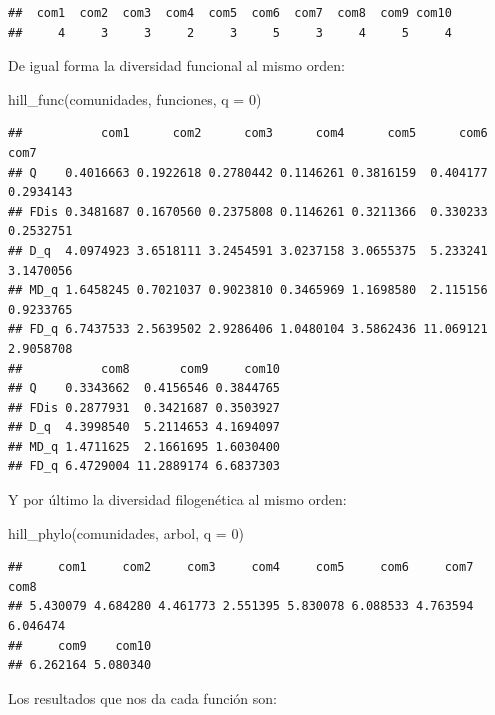 \documentclass[
]{article}
\newenvironment{Shaded}{\begin{snugshade}}{\end{snugshade}}
\newcommand{\AttributeTok}[1]{\textcolor[rgb]{0.77,0.63,0.00}{#1}}
\newcommand{\DecValTok}[1]{\textcolor[rgb]{0.00,0.00,0.81}{#1}}
\newcommand{\FunctionTok}[1]{\textcolor[rgb]{0.00,0.00,0.00}{#1}}
\newcommand{\NormalTok}[1]{#1}
\begin{document}
\begin{verbatim}
##  com1  com2  com3  com4  com5  com6  com7  com8  com9 com10 
##     4     3     3     2     3     5     3     4     5     4
\end{verbatim}

De igual forma la diversidad funcional al mismo orden:\\

\begin{Shaded}
\begin{Highlighting}[]
\FunctionTok{hill\_func}\NormalTok{(comunidades, funciones, }\AttributeTok{q =} \DecValTok{0}\NormalTok{)}
\end{Highlighting}
\end{Shaded}

\begin{verbatim}
##           com1      com2      com3      com4      com5      com6      com7
## Q    0.4016663 0.1922618 0.2780442 0.1146261 0.3816159  0.404177 0.2934143
## FDis 0.3481687 0.1670560 0.2375808 0.1146261 0.3211366  0.330233 0.2532751
## D_q  4.0974923 3.6518111 3.2454591 3.0237158 3.0655375  5.233241 3.1470056
## MD_q 1.6458245 0.7021037 0.9023810 0.3465969 1.1698580  2.115156 0.9233765
## FD_q 6.7437533 2.5639502 2.9286406 1.0480104 3.5862436 11.069121 2.9058708
##           com8       com9     com10
## Q    0.3343662  0.4156546 0.3844765
## FDis 0.2877931  0.3421687 0.3503927
## D_q  4.3998540  5.2114653 4.1694097
## MD_q 1.4711625  2.1661695 1.6030400
## FD_q 6.4729004 11.2889174 6.6837303
\end{verbatim}

\hfill\break
Y por último la diversidad filogenética al mismo orden:

\begin{Shaded}
\begin{Highlighting}[]
\FunctionTok{hill\_phylo}\NormalTok{(comunidades, arbol, }\AttributeTok{q =} \DecValTok{0}\NormalTok{) }
\end{Highlighting}
\end{Shaded}

\begin{verbatim}
##     com1     com2     com3     com4     com5     com6     com7     com8 
## 5.430079 4.684280 4.461773 2.551395 5.830078 6.088533 4.763594 6.046474 
##     com9    com10 
## 6.262164 5.080340
\end{verbatim}

\hfill\break
Los resultados que nos da cada función son:\\
\end{document}
